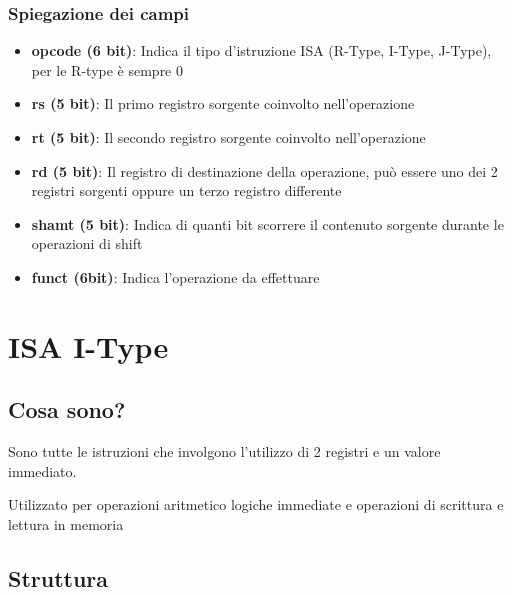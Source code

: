 \subsection{Spiegazione dei campi}
\begin{itemize}
    \item \textbf{opcode (6 bit)}: Indica il tipo d'istruzione ISA (R-Type, I-Type, J-Type), per le R-type è sempre 0
    \item \textbf{rs (5 bit)}: Il primo registro sorgente coinvolto nell'operazione
    \item \textbf{rt (5 bit)}: Il secondo registro sorgente coinvolto nell'operazione
    \item \textbf{rd (5 bit)}: Il registro di destinazione della operazione, può essere uno dei 2 registri sorgenti oppure un terzo registro differente
    \item \textbf{shamt (5 bit)}: Indica di quanti bit scorrere il contenuto sorgente durante le operazioni di shift
    \item \textbf{funct (6bit)}: Indica l'operazione da effettuare
\end{itemize}

\chapter{ISA I-Type}
\section{Cosa sono?}
Sono tutte le istruzioni che involgono l'utilizzo di 2 registri e un valore immediato.

Utilizzato per operazioni aritmetico logiche immediate e operazioni di scrittura e lettura in memoria

\section{Struttura}
